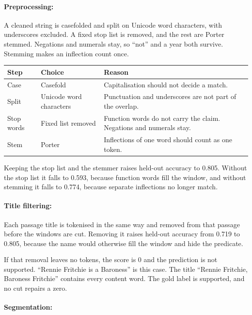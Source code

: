 \documentclass[12pt,a4paper]{article}
\begin{document}
\paragraph{Preprocessing:}

A cleaned string is casefolded and split on Unicode word characters, with underscores excluded. A fixed stop list is removed, and the rest are Porter stemmed. Negations and numerals stay, so ``not'' and a year both survive. Stemming makes an inflection count once.

\begin{center}
\small
\begin{tabular}{@{}llp{7.4cm}@{}}
\toprule
Step & Choice & Reason \\
\midrule
Case & Casefold & Capitalisation should not decide a match. \\
Split & Unicode word characters & Punctuation and underscores are not part of the overlap. \\
Stop words & Fixed list removed & Function words do not carry the claim. Negations and numerals stay. \\
Stem & Porter & Inflections of one word should count as one token. \\
\bottomrule
\end{tabular}
\end{center}

Keeping the stop list and the stemmer raises held-out accuracy to 0.805. Without the stop list it falls to 0.593, because function words fill the window, and without stemming it falls to 0.774, because separate inflections no longer match.

\paragraph{Title filtering:}

Each passage title is tokenised in the same way and removed from that passage before the windows are cut. Removing it raises held-out accuracy from 0.719 to 0.805, because the name would otherwise fill the window and hide the predicate.

If that removal leaves no tokens, the score is 0 and the prediction is not supported. ``Rennie Fritchie is a Baroness'' is this case. The title ``Rennie Fritchie, Baroness Fritchie'' contains every content word. The gold label is supported, and no cut repairs a zero.

\paragraph{Segmentation:}
\end{document}
